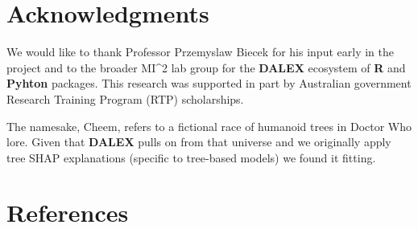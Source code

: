 \documentclass[
]{article}
\begin{document}
\hypertarget{acknowledgments}{%
\section{Acknowledgments}\label{acknowledgments}}

We would like to thank Professor Przemyslaw Biecek for his input early in the project and to the broader MI\^{}2 lab group for the \textbf{DALEX} ecosystem of \textbf{R} and \textbf{Pyhton} packages. This research was supported in part by Australian government Research Training Program (RTP) scholarships.

The namesake, Cheem, refers to a fictional race of humanoid trees in Doctor Who lore. Given that \textbf{DALEX} pulls on from that universe and we originally apply tree SHAP explanations (specific to tree-based models) we found it fitting.

\hypertarget{references}{%
\section*{References}\label{references}}
\end{document}
